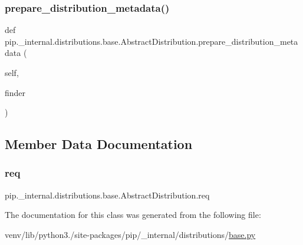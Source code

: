 \subsubsection{\texorpdfstring{prepare\+\_\+distribution\+\_\+metadata()}{prepare\_distribution\_metadata()}}
{\footnotesize\ttfamily def pip.\+\_\+internal.\+distributions.\+base.\+Abstract\+Distribution.\+prepare\+\_\+distribution\+\_\+metadata (\begin{DoxyParamCaption}\item[{}]{self,  }\item[{}]{finder }\end{DoxyParamCaption})}



\subsection{Member Data Documentation}
\mbox{\label{classpip_1_1__internal_1_1distributions_1_1base_1_1AbstractDistribution_a4e0f5834a91b4f3ab6be563959652df9}} 
\subsubsection{\texorpdfstring{req}{req}}
{\footnotesize\ttfamily pip.\+\_\+internal.\+distributions.\+base.\+Abstract\+Distribution.\+req}



The documentation for this class was generated from the following file\+:\begin{DoxyCompactItemize}
\item 
venv/lib/python3./site-\/packages/pip/\+\_\+internal/distributions/\hyperlink{__internal_2distributions_2base_8py}{base.\+py}\end{DoxyCompactItemize}

